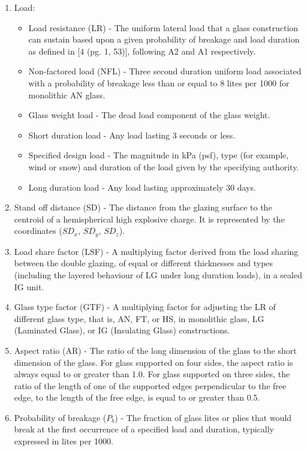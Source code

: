 \documentclass[12pt]{article}
\begin{document}
\begin{enumerate}
\begin{itemize}
\end{itemize}
\item{Load:}
\begin{itemize}
\item{Load resistance (LR) - The uniform lateral load that a glass construction can sustain based upon a given probability of breakage and load duration as defined in [4 (pg. 1, 53)], following A2 and A1 respectively.}
\item{Non-factored load (NFL) - Three second duration uniform load associated with a probability of breakage less than or equal to 8 lites per 1000 for monolithic AN glass.}
\item{Glass weight load - The dead load component of the glass weight.}
\item{Short duration load - Any load lasting 3 seconds or less.}
\item{Specified design load - The magnitude in kPa (psf), type (for example, wind or snow) and duration of the load given by the specifying authority.}
\item{Long duration load - Any load lasting approximately 30 days.}
\end{itemize}
\item{Stand off distance (SD) - The distance from the glazing surface to the centroid of a hemispherical high explosive charge. It is represented by the coordinates (${SD_{x}}$, ${SD_{y}}$, ${SD_{z}}$).}
\item{Load share factor (LSF) - A multiplying factor derived from the load sharing between the double glazing, of equal or different thicknesses and types (including the layered behaviour of LG under long duration loads), in a sealed IG unit.}
\item{Glass type factor (GTF) - A multiplying factor for adjusting the LR of different glass type, that is, AN, FT, or HS, in monolithic glass, LG (Laminated Glass), or IG (Insulating Glass) constructions.}
\item{Aspect ratio (AR) - The ratio of the long dimension of the glass to the short dimension of the glass. For glass supported on four sides, the aspect ratio is always equal to or greater than 1.0. For glass supported on three sides, the ratio of the length of one of the supported edges perpendicular to the free edge, to the length of the free edge, is equal to or greater than 0.5.}
\item{Probability of breakage (${P_{b}}$) - The fraction of glass lites or plies that would break at the first occurrence of a specified load and duration, typically expressed in lites per 1000.}
\end{enumerate}
\end{document}
